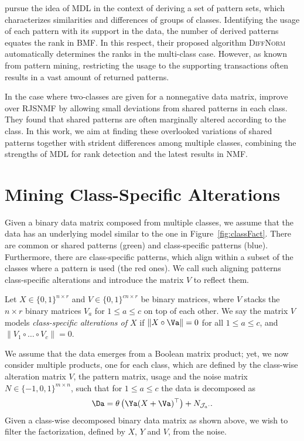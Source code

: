 \cite{vreeken2007characterising} pursue the idea of MDL in the context of deriving a set of pattern sets, which characterizes similarities and differences of groups of classes. Identifying the usage of each pattern with its support in the data, the number of derived patterns equates the rank in BMF. In this respect, their proposed algorithm \textsc{DiffNorm} automatically determines the ranks in the multi-class case. However, as known from pattern mining, restricting the usage to the supporting transactions often results in a vast amount of returned patterns.    

In the case where two-classes are given for a nonnegative data matrix, \cite{kim2015simultaneous} improve over RJSNMF by allowing small deviations from shared patterns in each class. They found that shared patterns are often marginally altered according to the class. In this work, we aim at finding these overlooked variations of shared patterns together with strident differences among multiple classes, combining the strengths of MDL for rank detection and the latest results in NMF.
\section{Mining Class-Specific Alterations}
Given a binary data matrix composed from multiple classes, we assume that the data has an underlying model similar to the one in Figure~\ref{fig:classFact}. There are common or shared patterns (green) and class-specific patterns (blue). Furthermore, there are class-specific patterns, which align within a subset of the classes where a pattern is used (the red ones). We call such aligning patterns class-specific alterations and introduce the matrix $V$ to reflect them.
\begin{definition}\label{def:CS:classSpecAlt}
Let $X\in\{0,1\}^{n\times r}$ and $V\in \{0,1\}^{cn\times r}$ be binary matrices, where $V$ stacks the $n\times r$ binary matrices $V_a$ for $1\leq a \leq c$ on top of each other.
We say the matrix $V$ models \emph{class-specific alterations of $X$} if $\lVert X\circ \Va\rVert =0$ for all $1\leq a\leq c$, and $\lVert V_1\circ\ldots\circ V_c\rVert =0$.
\end{definition}
We assume that the data emerges from a Boolean matrix product; yet, we now consider multiple products, one for each class, which are defined by the class-wise alteration matrix $V$, the pattern matrix, usage and the noise matrix $N\in\{-1,0,1\}^{m\times n}$, such that for $1\leq a\leq c$ the data is decomposed as
\begin{align}\label{eq:CS:VBMF}
\Da= \theta\left(\Ya(X+\Va)^\top \right) +N_{\mathcal{J}_a\cdot}.
\end{align}
Given a class-wise decomposed binary data matrix as shown above, we wish to filter the factorization, defined by $X$, $Y$ and $V$, from the noise.
